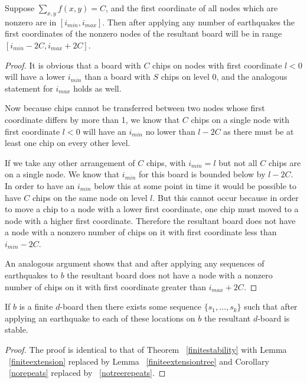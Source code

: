 \documentclass[runningheads,a4paper]{llncs}
\begin{document}
\begin{lemma}
\label{finiteextensiontree}
Suppose $\sum_{x,y} f(x,y) = C$, and the first coordinate of all nodes which are nonzero are in $[i_{min}, i_{max}]$. Then after applying any number of earthquakes the first coordinates of the nonzero nodes of the resultant board will be in range $[i_{min} - 2C, i_{max} + 2C]$.
\end{lemma}

\begin{proof}
It is obvious that a board with $C$ chips on nodes with first coordinate $l<0$ will have a lower $i_{min}$ than a board with $S$ chips on level 0, and the analogous statement for $i_{max}$ holds as well. 

Now because chips cannot be transferred between two nodes whose first coordinate differs by more than 1, we know that $C$ chips on a single node with first coordinate $l<0$ will have an $i_{min}$ no lower than $l-2C$ as there must be at least one chip on every other level. 

If we take any other arrangement of $C$ chips, with $i_{min}=l$ but not all $C$ chips are on a single node. We know that $i_{min}$ for this board is bounded below by $l-2C$. In order to have an $i_{min}$ below this at some point in time it would be possible to have $C$ chips on the same node on level $l$. But this cannot occur because in order to move a chip to a node with a lower first coordinate, one chip must moved to a node with a higher first coordinate. Therefore the resultant board does not have a node with a nonzero number of chips on it with first coordinate less than $i_{min} -2C$.

An analogous argument shows that  and after applying any sequences of earthquakes to $b$ the resultant board does not have a node with a nonzero number of chips on it with first coordinate greater than $i_{max}+2C$.
\end{proof}

\begin{theorem} If $b$ is a finite $d$-board then there exists some sequence $\{s_1, \ldots, s_k\}$ such that after applying an earthquake to each of these locations on $b$ the resultant $d$-board is stable.
\end{theorem}
\begin{proof}
The proof is identical to that of Theorem ~\ref{finitestability} with Lemma ~\ref{finiteextension} replaced by Lemma ~\ref{finiteextensiontree} and Corollary ~\ref{norepeats} replaced by ~\ref{notreerepeats}.
\end{proof}
\end{document}

